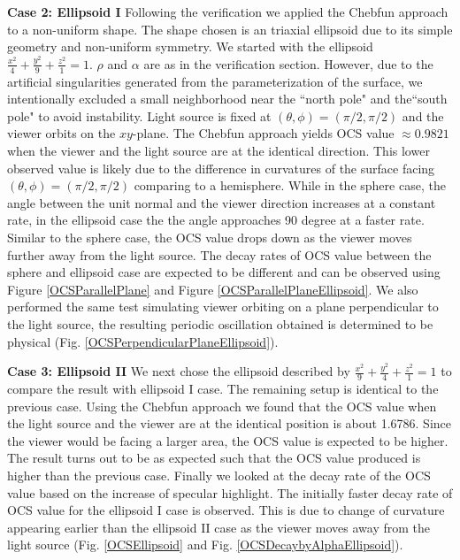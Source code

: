 \documentclass[11pt]{amsart}
\theoremstyle{definition}
\begin{document}
{\bf Case 2: Ellipsoid I} Following the verification we applied the Chebfun approach to a non-uniform shape. The shape chosen is an triaxial ellipsoid due to its simple geometry and non-uniform symmetry. We started with the ellipsoid $\frac{x^2}{4}+\frac{y^2}{9}+\frac{z^2}{1} = 1$. $\rho$ and $\alpha$ are as in the verification section. However, due to the artificial singularities generated from the parameterization of the surface, we intentionally excluded a small neighborhood near the ``north pole" and the``south pole" to avoid instability. Light source is fixed at $(\theta,\phi) = (\pi/2, \pi/2)$ and the viewer orbits on the $xy$-plane. The Chebfun approach yields OCS value $\approx 0.9821$ when the viewer and the light source are at the identical direction. This lower observed value is likely due to the difference in curvatures of the surface facing $(\theta, \phi)=(\pi/2, \pi/2)$ comparing to a hemisphere. While in the sphere case, the angle between the unit normal and the viewer direction increases at a constant rate, in the ellipsoid case the the angle approaches 90 degree at a faster rate. Similar to the sphere case, the OCS value drops down as the viewer moves further away from the light source. The decay rates of OCS value between the sphere and ellipsoid case are expected to be different and can be observed using Figure \ref{OCSParallelPlane} and Figure \ref{OCSParallelPlaneEllipsoid}. We also performed the same test simulating viewer orbiting on a plane perpendicular to the light source, the resulting periodic oscillation obtained is determined to be physical (Fig. \ref{OCSPerpendicularPlaneEllipsoid}).

{\bf Case 3: Ellipsoid II} We next chose the ellipsoid described by $\frac{x^2}{9}+\frac{y^2}{4}+\frac{z^2}{1} = 1$ to compare the result with ellipsoid I case. The remaining setup is identical to the previous case. Using the Chebfun approach we found that the OCS value when the light source and the viewer are at the identical position is about 1.6786. Since the viewer would be facing a larger area, the OCS value is expected to be higher. The result turns out to be as expected such that the OCS value produced is higher than the previous case. Finally we looked at the decay rate of the OCS value based on the increase of specular highlight. The initially faster decay rate of OCS value for the ellipsoid I case is observed. This is due to change of curvature appearing earlier than the ellipsoid II case as the viewer moves away from the light source (Fig. \ref{OCSEllipsoid} and Fig. \ref{OCSDecaybyAlphaEllipsoid}).
\end{document}

